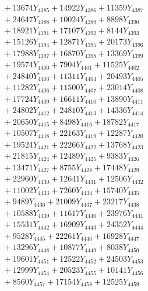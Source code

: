 \documentclass[a4paper,10pt]{article}
\begin{document}
{\begin{align}
&\;  + 13674 Y_{4385} + 14922 Y_{4386} + 11359 Y_{4387} \\[0.3ex]
&\;  + 24647 Y_{4388} + 10024 Y_{4389} + 8898 Y_{4390} \\[0.3ex]
&\;  + 18921 Y_{4391} + 17107 Y_{4392} + 8144 Y_{4393} \\[0.3ex]
&\;  + 15126 Y_{4394} + 12871 Y_{4395} + 20173 Y_{4396} \\[0.3ex]
&\;  + 17988 Y_{4397} + 16870 Y_{4398} + 13369 Y_{4399} \\[0.3ex]
&\;  + 19574 Y_{4400} + 7904 Y_{4401} + 11525 Y_{4402} \\[0.3ex]
&\;  + 24840 Y_{4403} + 11311 Y_{4404} + 20493 Y_{4405} \\[0.3ex]
&\;  + 11282 Y_{4406} + 11500 Y_{4407} + 23014 Y_{4408} \\[0.5ex]\allowbreak
&\;  + 17724 Y_{4409} + 16611 Y_{4410} + 13890 Y_{4411} \\[0.3ex]
&\;  + 24802 Y_{4412} + 24810 Y_{4413} + 14336 Y_{4414} \\[0.3ex]
&\;  + 20650 Y_{4415} + 8498 Y_{4416} + 18782 Y_{4417} \\[0.3ex]
&\;  + 10507 Y_{4418} + 22163 Y_{4419} + 12287 Y_{4420} \\[0.3ex]
&\;  + 19524 Y_{4421} + 22266 Y_{4422} + 13768 Y_{4423} \\[0.3ex]
&\;  + 21815 Y_{4424} + 12489 Y_{4425} + 9383 Y_{4426} \\[0.3ex]
&\;  + 13471 Y_{4427} + 8755 Y_{4428} + 17448 Y_{4429} \\[0.3ex]
&\;  + 22960 Y_{4430} + 12641 Y_{4431} + 12506 Y_{4432} \\[0.3ex]
&\;  + 11002 Y_{4433} + 7260 Y_{4434} + 15740 Y_{4435} \\[0.3ex]
&\;  + 9489 Y_{4436} + 21009 Y_{4437} + 23217 Y_{4438} \\[0.5ex]\allowbreak
&\;  + 10588 Y_{4439} + 11617 Y_{4440} + 23976 Y_{4441} \\[0.3ex]
&\;  + 15531 Y_{4442} + 16909 Y_{4443} + 24352 Y_{4444} \\[0.3ex]
&\;  + 9528 Y_{4445} + 22261 Y_{4446} + 16928 Y_{4447} \\[0.3ex]
&\;  + 13296 Y_{4448} + 10877 Y_{4449} + 8038 Y_{4450} \\[0.3ex]
&\;  + 19601 Y_{4451} + 12522 Y_{4452} + 24503 Y_{4453} \\[0.3ex]
&\;  + 12999 Y_{4454} + 20523 Y_{4455} + 10141 Y_{4456} \\[0.3ex]
&\;  + 8560 Y_{4457} + 17154 Y_{4458} + 12525 Y_{4459} \\[0.3ex]

\end{align}}
\end{document}
